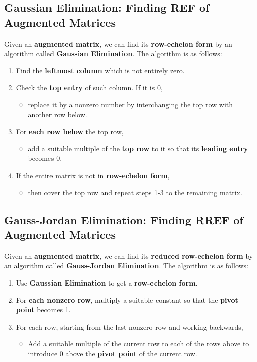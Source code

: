 \documentclass[../ma2001_notes.tex]{subfiles}
\begin{document}
\subsection{Gaussian Elimination: Finding REF of Augmented Matrices}
Given an \textbf{augmented matrix}, we can find its \textbf{row-echelon form} by an algorithm called \textbf{Gaussian Elimination}. The algorithm is as follows:
\begin{enumerate}
	\item Find the \textbf{leftmost column} which is not entirely zero.
	\item Check the \textbf{top entry} of such column. If it is 0,
	\begin{itemize}
		\item replace it by a nonzero number by interchanging the top row with another row below.
	\end{itemize}
	\item For \textbf{each row below} the top row,
	\begin{itemize}
		\item add a suitable multiple of the \textbf{top row} to it so that its \textbf{leading entry} becomes 0.
	\end{itemize}
	\item If the entire matrix is not in \textbf{row-echelon form},
	\begin{itemize}
		\item then cover the top row and repeat steps 1-3 to the remaining matrix.
	\end{itemize}
\end{enumerate}

\subsection{Gauss-Jordan Elimination: Finding RREF of Augmented Matrices}
Given an \textbf{augmented matrix}, we can find its \textbf{reduced row-echelon form} by an algorithm called \textbf{Gauss-Jordan Elimination}. The algorithm is as follows:
\begin{enumerate}
	\item Use \textbf{Gaussian Elimination} to get a \textbf{row-echelon form}.
	\item For \textbf{each nonzero row}, multiply a suitable constant so that the \textbf{pivot point} becomes 1.
	\item For each row, starting from the last nonzero row and working backwards,
	\begin{itemize}
		\item Add a suitable multiple of the current row to each of the rows above to introduce 0 above the \textbf{pivot point} of the current row.
	\end{itemize}
\end{enumerate}
\end{document}
